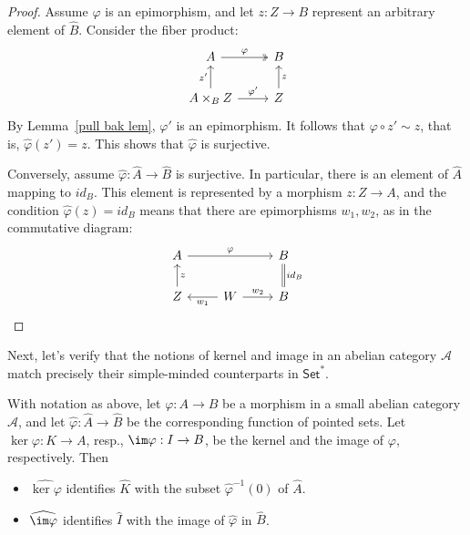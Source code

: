 \begin{proof}
Assume $\varphi$ is an epimorphism, and let $z:Z\to B$ represent an arbitrary element
of $\hat{B}$. Consider the fiber product:
\[\begin{tikzcd}
A\ar[r,twoheadrightarrow,"\varphi"]&B\\
A\times_{B}Z\ar[u,"z'"]\ar[r,"\varphi'"]&Z\ar[u,swap,"z"]
\end{tikzcd}\]
By Lemma~\ref{pull bak lem}, $\varphi'$ is an epimorphism. It follows that $\varphi\circ z'\sim z$, that is, $\hat{\varphi}(z')=z$. This shows that $\hat{\varphi}$ is surjective.\par
Conversely, assume $\hat{\varphi}:\hat{A}\to\hat{B}$ is surjective. In particular, there is an element of $\hat{A}$ mapping to $id_B$. This element is represented by a morphism $z:Z\to A$, and the condition $\hat{\varphi}(z)=id_B$ means that there are epimorphisms $w_1,w_2$, as in the commutative diagram:
\[\begin{tikzcd}
A\ar[rr,"\varphi"]&&B\\
Z\ar[u,swap,"z"]&W\ar[l,"w_1"]\ar[r,"w_2"]&B\ar[u,equal,swap,"id_B"]
\end{tikzcd}\]
\end{proof}
Next, let’s verify that the notions of kernel and image in an abelian category $\mathcal{A}$ match precisely their simple-minded counterparts in $\mathsf{Set}^*$.
\begin{lemma}
With notation as above, let $\varphi:A\to B$ be a morphism in a small abelian category $\mathcal{A}$, and let $\hat{\varphi}:\hat{A}\to\hat{B}$ be the corresponding function of pointed sets. Let $\ker\varphi:K\to A$, resp., $\im\varphi:I\to B$, be the kernel and the image of $\varphi$, respectively. Then
\begin{itemize}
\item $\widehat{\ker\varphi}$ identifies $\hat{K}$ with the subset $\hat{\varphi}^{-1}(0)$ of $\hat{A}$.
\item $\widehat{\im\varphi}$ identifies $\hat{I}$ with the image of $\hat{\varphi}$ in $\hat{B}$.
\end{itemize}
\end{lemma}
